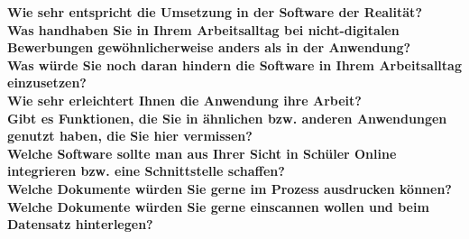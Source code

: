 \textbf{Wie sehr entspricht die Umsetzung in der Software der Realität?}\\

\textbf{Was handhaben Sie in Ihrem Arbeitsalltag bei nicht-digitalen Bewerbungen gewöhnlicherweise anders als in der Anwendung?}\\

\textbf{Was würde Sie noch daran hindern die Software in Ihrem Arbeitsalltag einzusetzen?}\\

\textbf{Wie sehr erleichtert Ihnen die Anwendung ihre Arbeit?}\\

\textbf{Gibt es Funktionen, die Sie in ähnlichen bzw. anderen Anwendungen genutzt haben, die Sie hier vermissen?}\\

\textbf{Welche Software sollte man aus Ihrer Sicht in Schüler Online integrieren bzw. eine Schnittstelle schaffen?}\\

\textbf{Welche Dokumente würden Sie gerne im Prozess ausdrucken können?}\\

\textbf{Welche Dokumente würden Sie gerne einscannen wollen und beim Datensatz hinterlegen?}\\